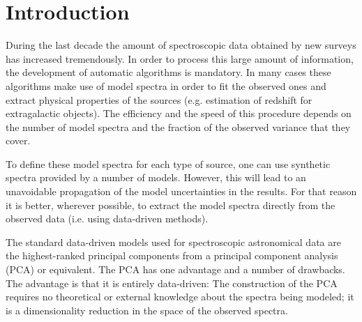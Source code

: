 \documentclass[apj]{emulateapj}
\begin{document}

\section{Introduction}\label{intro}
During the last decade the amount of spectroscopic data obtained by new surveys has increased tremendously. In order to process this large amount of information, the development of automatic algorithms is mandatory. In many cases these algorithms make use of model spectra in order to fit the observed ones and extract physical properties of the sources (e.g. estimation of redshift for extragalactic objects). The efficiency and the speed of this procedure depends on the number of model spectra and the fraction of the observed variance that they cover.

To define these model spectra for each type of source, one can use synthetic spectra provided by a number of models. However, this will lead to an unavoidable propagation of the model uncertainties in the results. For that reason it is better, wherever possible, to extract the model spectra directly from the observed data (i.e. using data-driven methods).

The standard data-driven models used for spectroscopic astronomical data are the highest-ranked principal components from a principal component analysis (PCA) or equivalent. The PCA has one advantage and a number of drawbacks.  The advantage is that it is entirely data-driven: The construction of the PCA requires no theoretical or external knowledge about the spectra being modeled; it is a dimensionality reduction in the space of the observed spectra.
\end{document}
